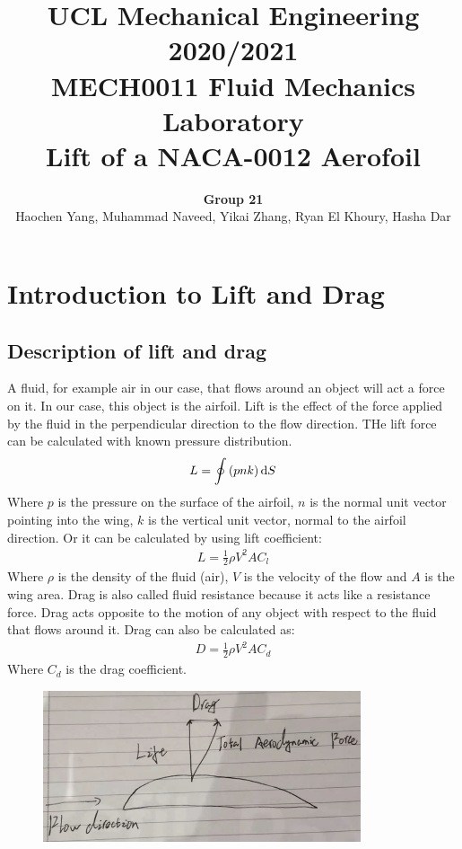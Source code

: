 \documentclass[11pt]{article}
\begin{document}
\title{\textbf{UCL Mechanical Engineering 2020/2021}\\MECH0011 Fluid Mechanics Laboratory\\
Lift of a NACA-0012 Aerofoil}
\author{\textbf{Group 21}\\Haochen Yang, Muhammad Naveed, Yikai Zhang, Ryan El Khoury, Hasha Dar}
\maketitle
\section*{Introduction to Lift and Drag}
\subsection*{Description of lift and drag}
A fluid, for example air in our case, that flows around an object will act a force on it. In our case, this object is the airfoil. Lift is the effect of the force applied by the fluid in the perpendicular direction to the flow direction. THe lift force can be calculated with known pressure distribution.
\begin{align}
  L = \oint \left(p n k \right)\dif S
\end{align}
Where $p$ is the pressure on the surface of the airfoil, $n$ is the normal unit vector pointing into the wing, $k$ is the vertical unit vector, normal to the airfoil direction. Or it can be calculated by using lift coefficient:
\begin{align}
  L = \frac{1}{2} \rho V^2 A C_l
\end{align}
Where $\rho$ is the density of the fluid (air), $V$ is the velocity of the flow and $A$ is the wing area. Drag is also called fluid resistance because it acts like a resistance force. Drag acts opposite to the motion of any object with respect to the fluid that flows around it. Drag can also be calculated as:
\begin{align}
  D = \frac{1}{2} \rho V^2 A C_d 
\end{align}
Where $C_d$ is the drag coefficient.
\begin{figure}[H]
  \centering
  \includegraphics[width = 0.5 \textwidth]{./img/diagram1.png}
  \caption{}
\end{figure}
\end{document}
